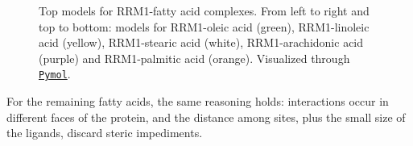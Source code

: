 \begin{figure}[htbp!]
    \endminipage
    \caption[Top models for RRM1-fatty acid complexes.]{Top models for RRM1-fatty acid complexes. From left to right and top to bottom: models for RRM1-oleic acid (green), RRM1-linoleic acid (yellow), RRM1-stearic acid (white), RRM1-arachidonic acid (purple) and RRM1-palmitic acid (orange). Visualized through \href{https://pymol.org/2/}{\texttt{Pymol}}.}
    \label{fig:complexesFinal}
\end{figure}

For the remaining fatty acids, the same reasoning holds: interactions occur in different faces of the protein, and the distance among sites, plus the small size of the ligands, discard steric impediments.\\